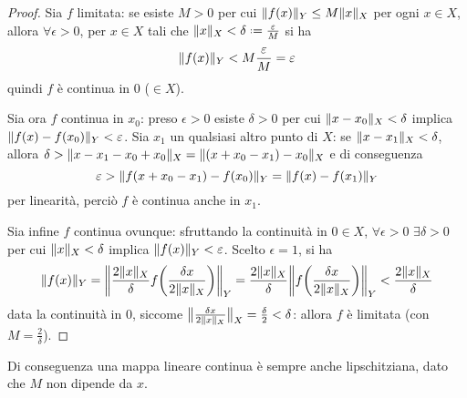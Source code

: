 \begin{proof}
    Sia $f$ limitata: se esiste $M>0$ per cui $\norm{f(x)}_Y\le M\norm{x}_X$ per ogni $x\in X$, allora $\forall\epsilon>0$, per $x\in X$ tali che $\norm{x}_X<\delta\defeq\frac{\epsilon}{M}$ si ha
    \begin{equation}
        \norm{f(x)}_Y<M\frac{\epsilon}{M}=\epsilon
    \end{equation}
    quindi $f$ è continua in $0$ ($\in X$).

    Sia ora $f$ continua in $x_0$: preso $\epsilon>0$ esiste $\delta>0$ per cui $\norm{x-x_0}_X<\delta$ implica $\norm{f(x)-f(x_0)}_Y<\epsilon$.
    Sia $x_1$ un qualsiasi altro punto di $X$: se $\norm{x-x_1}_X<\delta$, allora $\delta>\norm{x-x_1-x_0+x_0}_X=\norm{(x+x_0-x_1)-x_0}_X$ e di conseguenza
    \begin{equation}
        \epsilon>\norm{f(x+x_0-x_1)-f(x_0)}_Y=
        \norm{f(x)-f(x_1)}_Y
    \end{equation}
    per linearità, perciò $f$ è continua anche in $x_1$.

    Sia infine $f$ continua ovunque: sfruttando la continuità in $0\in X$, $\forall\epsilon>0$ $\exists\delta>0$ per cui $\norm{x}_X<\delta$ implica $\norm{f(x)}_Y<\epsilon$.
    Scelto $\epsilon=1$, si ha
    \begin{equation}
        \norm{f(x)}_Y=
        \norm[\bigg]{\frac{2\norm{x}_X}{\delta}f\biggl(\frac{\delta x}{2\norm{x}_X}\biggr)}_Y=
        \frac{2\norm{x}_X}{\delta}\norm[\bigg]{f\biggl(\frac{\delta x}{2\norm{x}_X}\biggr)}_Y<
        \frac{2\norm{x}_X}{\delta}
    \end{equation}
    data la continuità in $0$, siccome $\norm[\big]{\frac{\delta x}{2\norm{x}_X}}_X=\frac{\delta}2<\delta$: allora $f$ è limitata (con $M=\frac2{\delta}$).
\end{proof}
Di conseguenza una mappa lineare continua è sempre anche lipschitziana, dato che $M$ non dipende da $x$.


